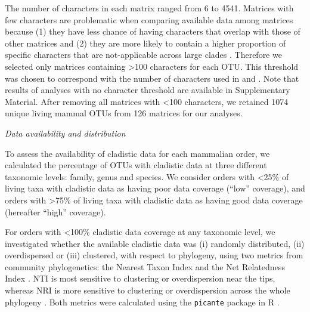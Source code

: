 \documentclass[12pt,letterpaper]{article}
\renewcommand{\subsection}[1]{%
\bigskip
\begin{center}
\begin{large}
\normalfont\itshape #1
\end{large}
\end{center}}
\begin{document}
The number of characters in each matrix ranged from 6 to 4541.
Matrices with few characters are problematic when comparing available data among matrices because (1) they have less chance of having characters that overlap with those of other matrices \citep{wagner2000} and (2) they are more likely to contain a higher proportion of specific characters that are not-applicable across large clades \citep[][e.g. ``antler ramifications'' is a character that is only applicable to Cervidae not all mammals]{Brazeau2011}.
Therefore we selected only matrices containing \textgreater 100 characters for each OTU.
This threshold was chosen to correspond with the number of characters used in \citet{GuillermeCooper} and \citet{harrisonamong-character2014}.
Note that results of analyses with no character threshold are available in Supplementary Material. 
After removing all matrices with \textless 100 characters, we retained 1074 unique living mammal OTUs from 126 matrices for our analyses. %

\subsection{Data availability and distribution}
To assess the availability of cladistic data for each mammalian order, we calculated the percentage of OTUs with cladistic data at three different taxonomic levels: family, genus and species.
We consider orders with \textless 25\% of living taxa with cladistic data as having poor data coverage (``low'' coverage), and orders with \textgreater 75\% of living taxa with cladistic data as having good data coverage (hereafter ``high'' coverage). 

For orders with \textless 100\% cladistic data coverage at any taxonomic level, we investigated whether the available cladistic data was (i) randomly distributed, (ii) overdispersed or (iii) clustered, with respect to phylogeny, using two metrics from community phylogenetics: the Nearest Taxon Index \citep[NTI;][]{webb2002phylogenies} and the Net Relatedness Index \citep[NRI;][]{webb2002phylogenies}. 
NTI is most sensitive to clustering or overdispersion near the tips, whereas NRI is more sensitive to clustering or overdispersion across the whole phylogeny \citep{Cooper2008}. 
Both metrics were calculated using the \texttt{picante} package in R \citep{picante,R}.
\end{document}
